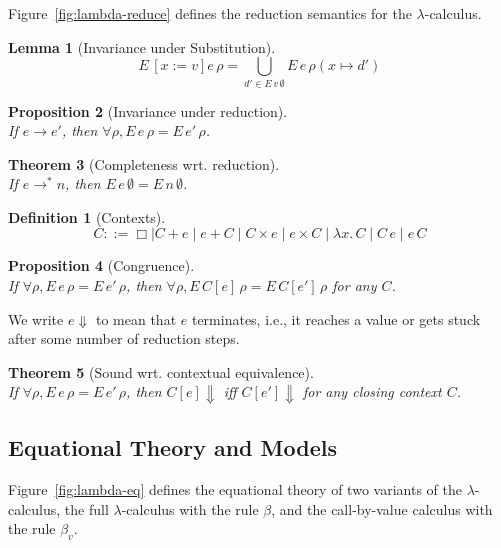 \documentclass{tufte-handout}
\newcommand{\LAM}[1]{\lambda #1.\,}
\newcommand{\APP}[0]{\,}
\newcommand{\by}[0]{\!:=\!}
\newcommand{\ext}[3]{#3(#1{\mapsto}#2)}
\newtheorem{theorem}{Theorem}%
\newtheorem{lemma}[theorem]{Lemma}
\newtheorem{proposition}[theorem]{Proposition}
\newtheorem{definition}{Definition}%
\begin{document}
Figure~\ref{fig:lambda-reduce} defines the reduction semantics
for the $\lambda$-calculus.

\begin{lemma}[Invariance under Substitution]
\[
  E\,[x\by v]e\,\rho = \bigcup_{d' \in E\,v\,\emptyset} E\,e\,\ext{x}{d'}{\rho}
\]
\end{lemma}

\begin{proposition}[Invariance under reduction]\ \\
\noindent If $e \longrightarrow e'$, then $\forall \rho, E\,e\,\rho =
E\,e'\,\rho$.
\end{proposition}

\begin{theorem}[Completeness wrt. reduction]\ \\
\noindent If $e \longrightarrow^{*} n$, then $E\,e\,\emptyset =
E\,n\,\emptyset$.
\end{theorem}

\begin{definition}[Contexts]
\[
  C ::= \Box \mid C + e \mid e + C \mid C \times e \mid e \times C \mid
       \LAM{x} C \mid C \APP e \mid e \APP C
\]
\end{definition}

\begin{proposition}[Congruence]\ \\
  If $\forall \rho, E\,e\,\rho = E\,e'\,\rho$, 
  then $\forall \rho, E\,C[e]\,\rho = E\,C[e']\,\rho$
  for any $C$.
\end{proposition}

We write $e\Downarrow$ to mean that $e$ terminates, i.e., it reaches a
value or gets stuck after some number of reduction steps.

\begin{theorem}[Sound wrt. contextual equivalence]\ \\
  If $\forall \rho, E\,e\,\rho = E\,e'\,\rho$, 
  then $C[e]\Downarrow$ iff $C[e']\Downarrow$ for any closing
  context $C$.
\end{theorem}


\subsection{Equational Theory and Models}

Figure~\ref{fig:lambda-eq} defines the equational theory of two
variants of the $\lambda$-calculus, the full $\lambda$-calculus with
the rule $\beta$, and the call-by-value calculus with the rule
$\beta_v.$
\end{document}
